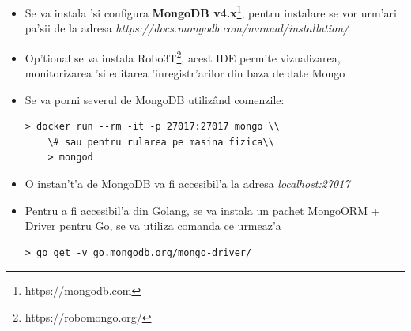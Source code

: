 \documentclass[12pt,a4paper,twoside]{report}
\begin{document}
\begin{enumerate}[label=Pasul \arabic*]
{\begin{itemize}
{\begin{tcolorbox}\label{run_couch}
    \scriptsize{
    \begin{Verbatim}[commandchars=\\\{\}]
	> go get -v github.com/couchbase/gocb
    \end{Verbatim}
    }
    \end{tcolorbox} }
\item{ Se va instala 'si configura \textbf{MongoDB v4.x}\footnote{https://mongodb.com}, pentru instalare se vor urm'ari pa'sii de la adresa \textit{https://docs.mongodb.com/manual/installation/}}
\item{Op'tional se va instala Robo3T\footnote{https://robomongo.org/}, acest IDE permite vizualizarea, monitorizarea 'si editarea 'inregistr'arilor din baza de date Mongo}
\item{Se va porni severul de MongoDB utilizând comenzile:
\begin{tcolorbox}\label{run_mongo}
    \scriptsize{
    \begin{Verbatim}[commandchars=\\\{\}]
	> docker run --rm -it -p 27017:27017 mongo \\
	\# sau pentru rularea pe masina fizica\\
	> mongod
    \end{Verbatim}
    }
    \end{tcolorbox} 
}
\item{O instan't'a de MongoDB va fi accesibil'a la adresa \textit{localhost:27017}}
\item{Pentru a fi accesibil'a din Golang, se va instala un pachet MongoORM + Driver pentru Go, se va utiliza comanda ce urmeaz'a 
\begin{tcolorbox}\label{get_mongo}
    \scriptsize{
    \begin{Verbatim}[commandchars=\\\{\}]
	> go get -v go.mongodb.org/mongo-driver/
    \end{Verbatim}
    }
    \end{tcolorbox} 
}

\end{itemize}

}
\end{enumerate}
\end{document}
